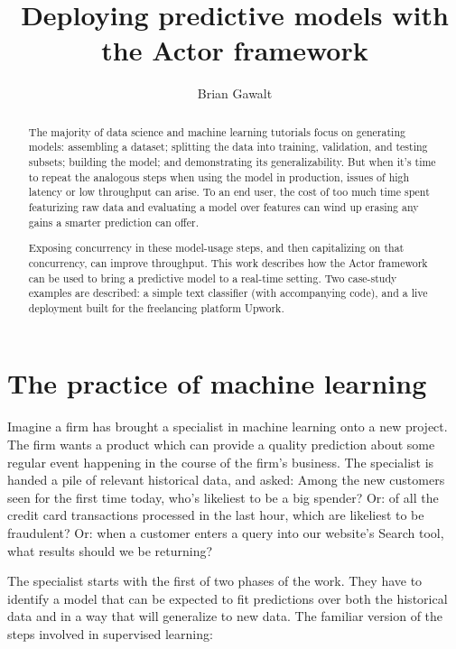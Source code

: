 \documentclass{article}
\begin{document}
\title{Deploying predictive models with the Actor framework}
\author{Brian Gawalt}

\maketitle


\begin{abstract}
The majority of data science and machine learning tutorials focus on generating models: assembling a dataset; splitting the data into training, validation, and testing subsets; building the model; and demonstrating its generalizability. But when it's time to repeat the analogous steps when using the model in production, issues of high latency or low throughput can arise. To an end user, the cost of too much time spent featurizing raw data and evaluating a model over features can wind up erasing any gains a smarter prediction can offer. 

Exposing concurrency in these model-usage steps, and then capitalizing on that concurrency, can improve throughput. This work describes how the Actor framework can be used to bring a predictive model to a real-time setting. Two case-study examples are described: a simple text classifier (with accompanying code), and a live deployment built for the freelancing platform Upwork.
\end{abstract}

\section{The practice of machine learning}

Imagine a firm has brought a specialist in machine learning onto a new project. The firm wants a product which can provide a quality prediction about some regular event happening in the course of the firm's business. The specialist is handed a pile of relevant historical data, and asked: Among the new customers seen for the first time today, who's likeliest to be a big spender? Or: of all the credit card transactions processed in the last hour, which are likeliest to be fraudulent? Or: when a customer enters a query into our website's Search tool, what results should we be returning?

The specialist starts with the first of two phases of the work. They have to identify a model that can be expected to fit predictions over both the historical data and in a way that will generalize to new data. The familiar version of the steps involved in supervised learning: 
\end{document}
